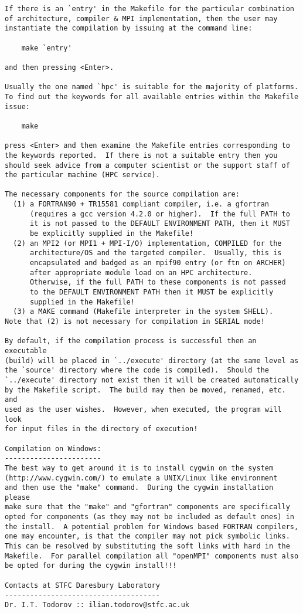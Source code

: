 \begin{verbatim}
If there is an `entry' in the Makefile for the particular combination
of architecture, compiler & MPI implementation, then the user may
instantiate the compilation by issuing at the command line:

	make `entry'

and then pressing <Enter>.

Usually the one named `hpc' is suitable for the majority of platforms.
To find out the keywords for all available entries within the Makefile
issue:

	make

press <Enter> and then examine the Makefile entries corresponding to
the keywords reported.  If there is not a suitable entry then you
should seek advice from a computer scientist or the support staff of
the particular machine (HPC service).

The necessary components for the source compilation are:
  (1) a FORTRAN90 + TR15581 compliant compiler, i.e. a gfortran
      (requires a gcc version 4.2.0 or higher).  If the full PATH to
      it is not passed to the DEFAULT ENVIRONMENT PATH, then it MUST
      be explicitly supplied in the Makefile!
  (2) an MPI2 (or MPI1 + MPI-I/O) implementation, COMPILED for the
      architecture/OS and the targeted compiler.  Usually, this is
      encapsulated and badged as an mpif90 entry (or ftn on ARCHER)
      after appropriate module load on an HPC architecture.
      Otherwise, if the full PATH to these components is not passed
      to the DEFAULT ENVIRONMENT PATH then it MUST be explicitly
      supplied in the Makefile!
  (3) a MAKE command (Makefile interpreter in the system SHELL).
Note that (2) is not necessary for compilation in SERIAL mode!

By default, if the compilation process is successful then an executable
(build) will be placed in `../execute' directory (at the same level as
the `source' directory where the code is compiled).  Should the
`../execute' directory not exist then it will be created automatically
by the Makefile script.  The build may then be moved, renamed, etc. and
used as the user wishes.  However, when executed, the program will look
for input files in the directory of execution!

Compilation on Windows:
-----------------------
The best way to get around it is to install cygwin on the system
(http://www.cygwin.com/) to emulate a UNIX/Linux like environment
and then use the "make" command.  During the cygwin installation please
make sure that the "make" and "gfortran" components are specifically
opted for components (as they may not be included as default ones) in
the install.  A potential problem for Windows based FORTRAN compilers,
one may encounter, is that the compiler may not pick symbolic links.
This can be resolved by substituting the soft links with hard in the
Makefile.  For parallel compilation all "openMPI" components must also
be opted for during the cygwin install!!!

Contacts at STFC Daresbury Laboratory
-------------------------------------
Dr. I.T. Todorov :: ilian.todorov@stfc.ac.uk
\end{verbatim}

